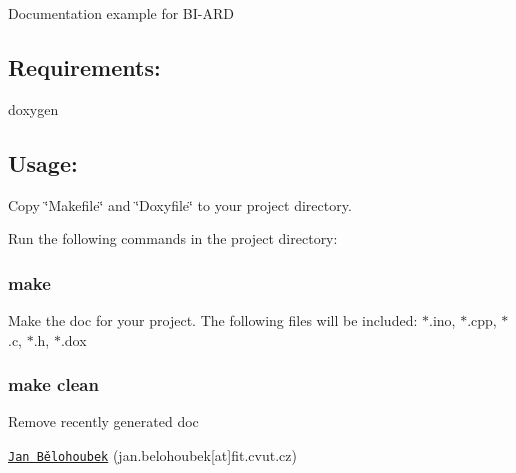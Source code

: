 Documentation example for B\+I-\/\+A\+RD 

\subsection*{Requirements\+:}


\begin{DoxyItemize}
\item doxygen 
\end{DoxyItemize}

\subsection*{Usage\+:}

Copy \char`\"{}\+Makefile\char`\"{} and \char`\"{}\+Doxyfile\char`\"{} to your project directory.

Run the following commands in the project directory\+:

\subsubsection*{make}

Make the doc for your project. The following files will be included\+: $\ast$.ino, $\ast$.cpp, $\ast$.c, $\ast$.h, $\ast$.dox 

\subsubsection*{make clean}

Remove recently generated doc

\href{http://users.fit.cvut.cz/~belohja4/}{\tt Jan Bělohoubek} (jan.\+belohoubek\mbox{[}at\mbox{]}fit.\+cvut.\+cz)  